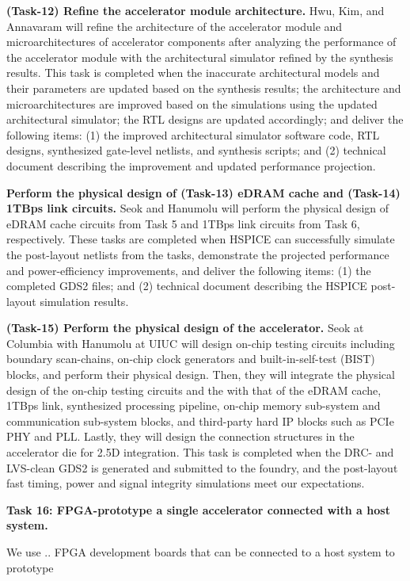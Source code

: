 \noindent
\textbf{(Task-12) Refine the accelerator module architecture.} 
Hwu, Kim, and Annavaram will refine the architecture of the accelerator module and microarchitectures of accelerator components after analyzing the performance of the accelerator module with the architectural simulator refined by the synthesis results.
This task is completed when the inaccurate architectural models and their parameters are updated based on the synthesis results; the architecture and microarchitectures are improved based on the simulations using the updated architectural simulator; the RTL designs are updated accordingly; and deliver the following items:
(1) the improved architectural simulator software code, RTL designs, synthesized gate-level netlists, and synthesis scripts; and (2) technical document describing the improvement and updated performance projection.


\noindent
\textbf{Perform the physical design of (Task-13) eDRAM cache and (Task-14)  1TBps link circuits.} 
Seok and Hanumolu will perform the physical design of eDRAM cache circuits from Task 5 and 1TBps link circuits from Task 6, respectively.
These tasks are completed when HSPICE can successfully simulate the post-layout netlists from the tasks, demonstrate the projected performance and power-efficiency improvements, and deliver the following items:
(1) the completed GDS2 files; and (2) technical document describing the HSPICE post-layout simulation results.


\noindent
\textbf{(Task-15) Perform the physical design of the accelerator.} 
Seok at Columbia with Hanumolu at UIUC will design on-chip testing circuits including boundary scan-chains, on-chip clock generators and built-in-self-test (BIST) blocks, and perform their physical design.
Then, they will integrate the physical design of the on-chip testing circuits and the with that of the eDRAM cache, 1TBps link, synthesized processing pipeline, on-chip memory sub-system and communication sub-system blocks, and third-party hard IP blocks such as PCIe PHY and PLL.
Lastly, they will design the connection structures in the accelerator die for 2.5D integration. 
This task is completed when the DRC- and LVS-clean GDS2 is generated and submitted to the foundry, and the post-layout fast timing, power and signal integrity simulations meet our expectations.


\noindent
\textbf{Task 16: FPGA-prototype a single accelerator connected with a host system.}

We use .. FPGA development boards that can be connected to a host system to prototype


